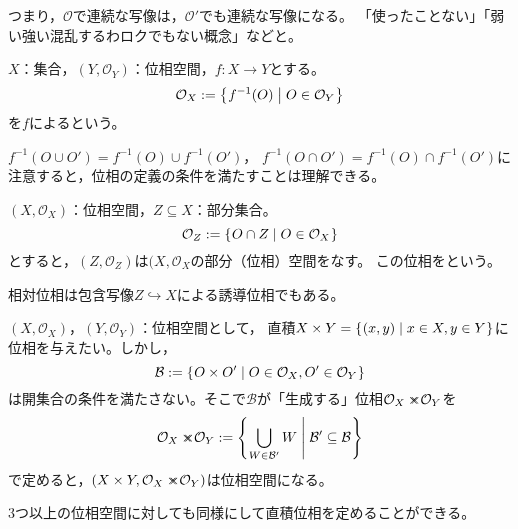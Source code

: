 \documentclass[uplatex]{jsarticle}
\begin{document}
つまり，$\mathcal{O}$で連続な写像は，$\mathcal{O}'$でも連続な写像になる。
{\footnotesize「使ったことない」「弱い強い混乱するわロクでもない概念」などと。}

\sukima {}

\newcommand{\dtimes}{\times\mkern-16mu\times}

\begin{teigi}[誘導位相]
  $X$：集合，$(Y,\mathcal{O}_{Y})$：位相空間，$f \colon X \longrightarrow Y$とする。
  \begin{equation}
    \mathcal{O}_{X} := \Set{\hspace{-1.8pt} f^{-1}(O) | O \in \mathcal{O}_{Y} \hspace{-1.8pt}}
  \end{equation}
  を$f$によるという。
\end{teigi}

$f^{-1} (O \cup O') = f^{-1} (O) \cup f^{-1} (O')$，
$f^{-1} (O \cap O') = f^{-1} (O) \cap f^{-1} (O')$に注意すると，位相の定義の条件を満たすことは理解できる。

\begin{teigi}[相対位相]
  $(X, \mathcal{O}_{X})$：位相空間，$Z \subseteq X$：部分集合。
  \begin{equation}
    \mathcal{O}_{Z} := \Set{\hspace{-1.8pt} O \cap Z | O \in \mathcal{O}_{X} \hspace{-1.8pt}}
  \end{equation}
  とすると，$(Z, \mathcal{O}_{Z})$は$(X, \mathcal{O}_{X}$の部分（位相）空間をなす。
  この位相をという。
\end{teigi}

相対位相は包含写像$Z \hookrightarrow X$による誘導位相でもある。

\sukima {}

$(X, \mathcal{O}_{X})$，$(Y, \mathcal{O}_{Y})$：位相空間として，
直積$X \times Y = \Set{\hspace{-1.8pt} (x,y) | x \in X, y \in Y \hspace{-1.8pt}}$に位相を与えたい。しかし，
\begin{equation}
  \mathcal{B} := \Set{\hspace{-1.8pt} O \times O' | O \in \mathcal{O}_{X}, O' \in \mathcal{O}_{Y} \hspace{-1.8pt}}
\end{equation}
は開集合の条件を満たさない。そこで$\mathcal{B}$が「生成する」位相$\mathcal{O}_{X} \dtimes \mathcal{O}_{Y}$を
\begin{equation}
  \mathcal{O}_{X} \dtimes \mathcal{O}_{Y} := \sets{ \bigcup_{W \in \mathcal{B}'} W | \mathcal{B}' \subseteq \mathcal{B}}
\end{equation}
で定めると，$(X \times Y, \mathcal{O}_{X} \dtimes \mathcal{O}_{Y})$は位相空間になる。

3つ以上の位相空間に対しても同様にして直積位相を定めることができる。
\end{document}
